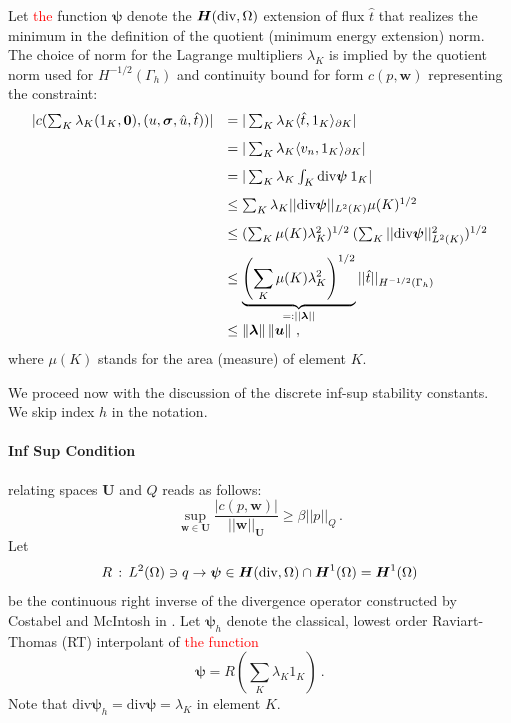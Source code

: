 \documentclass[letterpaper]{article}
\newcommand{\norm}[1]{\left\| #1 \right\|}
\newcommand{\ptl}{{\partial}}
\newcommand{\bfsig}{\mbox{\boldmath $\sigma$}}
\newcommand{\bfu}{\boldsymbol u}
\newcommand{\bfU}{\boldsymbol U}
\newcommand{\bfw}{\boldsymbol w}
\newcommand{\bfpsi}{\boldsymbol\psi}
\newcommand{\bflambda}{\boldsymbol\lambda}
\newcommand{\bfH}{\mbox{\boldmath $H$}}
\newcommand{\red}[1]{\textcolor{red}{#1}}
\begin{document}
Let \red{the} function $\bfpsi$ denote the $\bfH(\text{div},\Omega)$ extension of flux $\hat{t}$
that realizes the minimum in the definition of the quotient (minimum energy
extension) norm.
The choice of norm for the Lagrange multipliers $\lambda_K$ is implied
by the quotient norm used for $H^{-1/2}(\Gamma_h)$ and continuity
bound for form $c(p,\bfw)$ representing the constraint:
\red{
\begin{equation}
\begin{array}{lll}
| c(\sum_K \lambda_K (1_K,{\bf 0}),(u,\bfsig,\hat{u},\hat{t})) |
& = | \sum_K \lambda_K \langle \hat{t}, 1_K \rangle_{\ptl K} | \\[8pt]
& = | \sum_K \lambda_K \langle v_n , 1_K \rangle_{\ptl K} | \\[8pt]
& = | \sum_K \lambda_K \int_K \text{div} \bfpsi \: 1_K  | \\[8pt]
& \leq \sum_K  \lambda_K || \text{div} \bfpsi ||_{L^2(K)} \mu(K)^{1/2} \\[8pt]
& \leq (\sum_K \mu(K) \lambda_K^2)^{1/2} \: (\sum_K || \text{div} \bfpsi ||_{L^2(K)}^2 )^{1/2} \\[8pt]
& \leq \underbrace{\left(\sum_K \mu(K) \lambda_K^2\right)^{1/2}}_{=: || \bflambda ||} ||
\hat{t} ||_{H^{-1/2}(\Gamma_h)}\\[8pt]
& \leq \norm{\bflambda}\norm{\bfu}
\,,
\end{array}
\end{equation}
}
where $\mu(K)$ stands for the area (measure) of element $K$.

We proceed now with the discussion of the discrete inf-sup stability constants. We skip
index $h$ in the notation.

\paragraph{Inf Sup Condition} relating spaces $\bfU$ and $Q$ reads as follows:
\begin{equation}
   \sup_{\bfw \in \bfU} \frac{| c(p,\bfw) |}{|| \bfw ||_{\bfU}} \geq \beta ||
   p ||_Q\,.
\end{equation}
Let
\begin{equation}
R\, : \, L^2(\Omega) \ni q \to \bfpsi \in \bfH(\text{div},\Omega) \cap \bfH^1(\Omega)
=\bfH^1(\Omega)
\end{equation}
be
the continuous right inverse of the divergence operator constructed by
Costabel and McIntosh in \cite{CostabelMcIntosh}.
Let $\bfpsi_h$ denote the classical, lowest order Raviart-Thomas (RT) interpolant of
\red{the function}
\begin{equation}
\bfpsi = R (\sum_K \lambda_K 1_K) \: .
\end{equation}
Note that $\text{div} \bfpsi_h = \text{div} \bfpsi = \lambda_K$ in element $K$.
\end{document}
